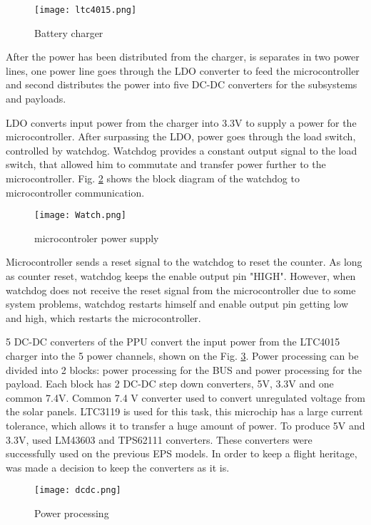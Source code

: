   \begin{figure}[h]
  	\centering
  	\texttt{[image: ltc4015.png]}
  	\caption{Battery charger}
  	\label{fig: ltc40151}
  \end{figure}
  
 After the power has been distributed from the charger, is separates in two power lines, one power line goes through the LDO converter to feed the microcontroller and second distributes the power into five DC-DC converters for the subsystems and payloads.
 
 LDO converts input power from the charger into 3.3V to supply a power for the microcontroller. After surpassing the LDO, power goes through the load switch, controlled by watchdog. Watchdog provides a constant output signal to the load switch, that allowed him to commutate and transfer power further to the microcontroller. Fig. \ref{fig: mic} shows the block diagram of the watchdog to microcontroller communication.
  
    \begin{figure}[h]
    	\centering
    	\texttt{[image: Watch.png]}
    	\caption{microcontroler power supply}
    	\label{fig: mic}
    \end{figure}
  Microcontroller sends a reset signal to the watchdog to reset the counter. As long as counter reset, watchdog keeps the enable output pin "HIGH". However, when watchdog does not receive the reset signal from the microcontroller due to some system problems, watchdog restarts himself and enable output pin getting low and high, which restarts the microcontroller. 
  
  5 DC-DC converters of the PPU convert the input power from the LTC4015 charger into the 5 power channels, shown on the Fig. \ref{fig: dc}. Power processing can be divided into 2 blocks: power processing for the BUS and power processing for the payload. Each block has 2 DC-DC step down converters, 5V, 3.3V and one common 7.4V. Common 7.4 V converter used to convert unregulated voltage from the solar panels. LTC3119 is used for this task, this microchip has a large current tolerance, which allows it to transfer a huge amount of power. To produce 5V and 3.3V, used LM43603 and TPS62111 converters. These converters were successfully used on the previous EPS models. In order to keep a flight heritage, was made a decision to keep the converters as it is. 
  
   \begin{figure}[h]
   	\centering
   	\texttt{[image: dcdc.png]}
   	\caption{Power processing}
   	\label{fig: dc}
   \end{figure}
  
